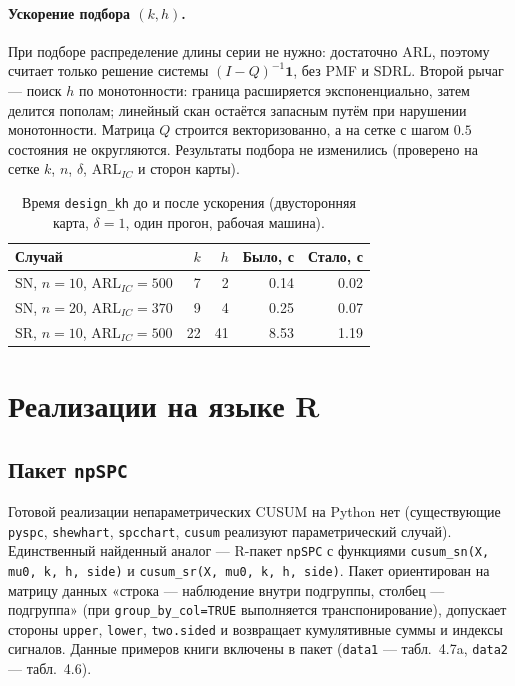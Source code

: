 \documentclass[11pt,a4paper]{article}
\newcommand{\SN}{\mathrm{SN}}
\newcommand{\SR}{\mathrm{SR}}
\newcommand{\ARL}{\mathrm{ARL}}
\newcommand{\SDRL}{\mathrm{SDRL}}
\begin{document}
\paragraph{Ускорение подбора $(k,h)$.}
При подборе распределение длины серии не нужно: достаточно $\ARL$, поэтому
 считает только решение системы $(I-Q)^{-1}\mathbf{1}$,
без PMF и $\SDRL$. Второй рычаг --- поиск $h$ по монотонности: граница
расширяется экспоненциально, затем делится пополам; линейный скан остаётся
запасным путём при нарушении монотонности. Матрица $Q$ строится
векторизованно, а на сетке с шагом $0.5$ состояния не округляются.
Результаты подбора не изменились (проверено на сетке $k$, $n$, $\delta$,
$\ARL_{IC}$ и сторон карты).

\begin{table}[htbp]
\centering
\caption{Время \texttt{design\_kh} до и после ускорения (двусторонняя карта,
$\delta=1$, один прогон, рабочая машина).}
\label{tab:design-speedup}
\small
\begin{tabular}{lrrrr}
\toprule
Случай & $k$ & $h$ & Было, с & Стало, с \\
\midrule
$\SN$, $n=10$, $\ARL_{IC}=500$ & 7 & 2 & 0.14 & 0.02 \\
$\SN$, $n=20$, $\ARL_{IC}=370$ & 9 & 4 & 0.25 & 0.07 \\
$\SR$, $n=10$, $\ARL_{IC}=500$ & 22 & 41 & 8.53 & 1.19 \\
\bottomrule
\end{tabular}
\normalsize
\end{table}

\section{Реализации на языке R}
\label{sec:r}

\subsection{Пакет \texttt{npSPC}}
\label{sec:npspc}

Готовой реализации непараметрических CUSUM на Python нет (существующие
\texttt{pyspc}, \texttt{shewhart}, \texttt{spcchart}, \texttt{cusum}
реализуют параметрический случай). Единственный найденный аналог ---
R-пакет \texttt{npSPC} \cite{Nascimento2026} с функциями
\texttt{cusum\_sn(X, mu0, k, h, side)} и
\texttt{cusum\_sr(X, mu0, k, h, side)}. Пакет ориентирован на матрицу
данных «строка --- наблюдение внутри подгруппы, столбец --- подгруппа»
(при \texttt{group\_by\_col=TRUE} выполняется транспонирование), допускает
стороны \texttt{upper}, \texttt{lower}, \texttt{two.sided} и возвращает
кумулятивные суммы и индексы сигналов. Данные примеров книги включены в
пакет (\texttt{data1} --- табл.~4.7a, \texttt{data2} --- табл.~4.6).
\end{document}
